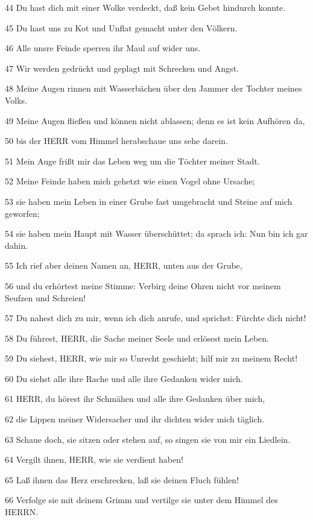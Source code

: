 \par 44 Du hast dich mit einer Wolke verdeckt, daß kein Gebet hindurch konnte.
\par 45 Du hast uns zu Kot und Unflat gemacht unter den Völkern.
\par 46 Alle unsre Feinde sperren ihr Maul auf wider uns.
\par 47 Wir werden gedrückt und geplagt mit Schrecken und Angst.
\par 48 Meine Augen rinnen mit Wasserbächen über den Jammer der Tochter meines Volks.
\par 49 Meine Augen fließen und können nicht ablassen; denn es ist kein Aufhören da,
\par 50 bis der HERR vom Himmel herabschaue uns sehe darein.
\par 51 Mein Auge frißt mir das Leben weg um die Töchter meiner Stadt.
\par 52 Meine Feinde haben mich gehetzt wie einen Vogel ohne Ursache;
\par 53 sie haben mein Leben in einer Grube fast umgebracht und Steine auf mich geworfen;
\par 54 sie haben mein Haupt mit Wasser überschüttet; da sprach ich: Nun bin ich gar dahin.
\par 55 Ich rief aber deinen Namen an, HERR, unten aus der Grube,
\par 56 und du erhörtest meine Stimme: Verbirg deine Ohren nicht vor meinem Seufzen und Schreien!
\par 57 Du nahest dich zu mir, wenn ich dich anrufe, und sprichst: Fürchte dich nicht!
\par 58 Du führest, HERR, die Sache meiner Seele und erlösest mein Leben.
\par 59 Du siehest, HERR, wie mir so Unrecht geschieht; hilf mir zu meinem Recht!
\par 60 Du siehst alle ihre Rache und alle ihre Gedanken wider mich.
\par 61 HERR, du hörest ihr Schmähen und alle ihre Gedanken über mich,
\par 62 die Lippen meiner Widersacher und ihr dichten wider mich täglich.
\par 63 Schaue doch, sie sitzen oder stehen auf, so singen sie von mir ein Liedlein.
\par 64 Vergilt ihnen, HERR, wie sie verdient haben!
\par 65 Laß ihnen das Herz erschrecken, laß sie deinen Fluch fühlen!
\par 66 Verfolge sie mit deinem Grimm und vertilge sie unter dem Himmel des HERRN.

